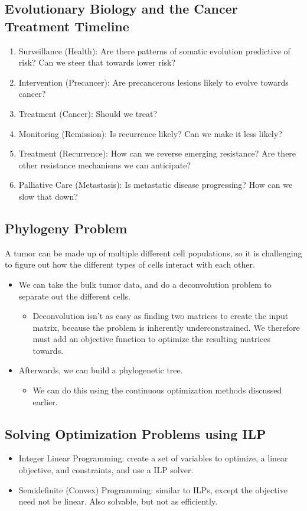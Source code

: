 \documentclass[10pt]{article}
\begin{document}
\subsection*{Evolutionary Biology and the Cancer Treatment Timeline}
\begin{enumerate}
	\item Surveillance (Health): Are there patterns of somatic evolution predictive of risk?  Can we steer that towards lower risk?
	\item Intervention (Precancer): Are precancerous lesions likely to evolve towards cancer?
	\item Treatment (Cancer): Should we treat?
	\item Monitoring (Remission): Is recurrence likely?  Can we make it less likely?
	\item Treatment (Recurrence): How can we reverse emerging resistance?  Are there other resistance mechanisms we can anticipate?
	\item Palliative Care (Metastasis): Is metastatic disease progressing?  How can we slow that down?
\end{enumerate}

\subsection*{Phylogeny Problem}
A tumor can be made up of multiple different cell populations, so it is challenging to figure out how the different types of cells interact with each other.
\begin{itemize}
	\item We can take the bulk tumor data, and do a deconvolution problem to separate out the different cells.
	\begin{itemize}
	    \item Deconvolution isn't as easy as finding two matrices to create the input matrix, because the problem is inherently underconstrained.  We therefore must add an objective function to optimize the resulting matrices towards.
    \end{itemize}
	\item Afterwards, we can build a phylogenetic tree.
	\begin{itemize}
	    \item We can do this using the continuous optimization methods discussed earlier.
    \end{itemize}   
\end{itemize}

\subsection*{Solving Optimization Problems using ILP}
\begin{itemize}
	\item Integer Linear Programming: create a set of variables to optimize, a linear objective, and constraints, and use a ILP solver.
	\item Semidefinite (Convex) Programming: similar to ILPs, except the objective need not be linear.  Also solvable, but not as efficiently.
\end{itemize}
\end{document}

